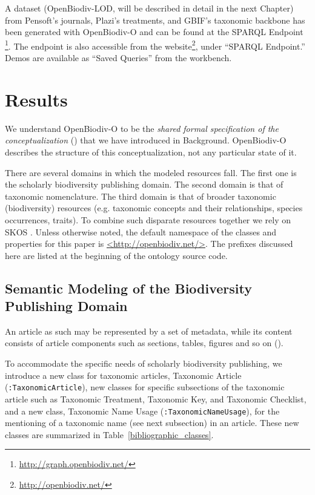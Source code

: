 A dataset (OpenBiodiv-LOD, will be described in detail in the next Chapter) from Pensoft's journals, Plazi's treatments, and GBIF's taxonomic backbone has been generated with \mbox{OpenBiodiv-O} and can be found at the SPARQL Endpoint \footnote{\href{http://graph.openbiodiv.net/}{http://graph.openbiodiv.net/}}. The endpoint is also accessible from the website\footnote{\href{http://openbiodiv.net/}{http://openbiodiv.net/}}, under ``SPARQL Endpoint.'' Demos are available as ``Saved Queries'' from the workbench.

\section{Results}

We understand OpenBiodiv-O to be the \emph{shared formal specification of the conceptualization} (\cite{gruber_translation_1993,obitko_translations_2007,staab_handbook_2009}) that we have introduced in Background. OpenBiodiv-O describes the structure of this conceptualization, not any particular state of it.

There are several domains in which the modeled resources fall. The first one is the scholarly biodiversity publishing domain. The second domain is that of taxonomic nomenclature. The third domain is that of broader taxonomic (biodiversity) resources (e.g. taxonomic concepts and their relationships, species occurrences, traits). To combine such disparate resources together we rely on SKOS \cite{miles_skos_nodate}. Unless otherwise noted, the default namespace of the classes and properties for this paper is \url{<http://openbiodiv.net/>}. The prefixes discussed here are listed at the beginning of the ontology source code.

\subsection{Semantic Modeling of the Biodiversity Publishing Domain}

An article as such may be represented by a set of metadata, while its content consists of article components such as sections, tables, figures and so on (\cite{peroni_example_2015}).

To accommodate the specific needs of scholarly biodiversity publishing, we introduce a new class for taxonomic articles, Taxonomic Article ({\tt :TaxonomicArticle}), new classes for specific subsections of the taxonomic
article such as Taxonomic Treatment, Taxonomic Key, and Taxonomic Checklist, and a new class, Taxonomic Name Usage ({\tt :TaxonomicNameUsage}), for the mentioning of a taxonomic name (see next subsection) in an article. These new classes are summarized in Table~\ref{bibliographic_classes}.

